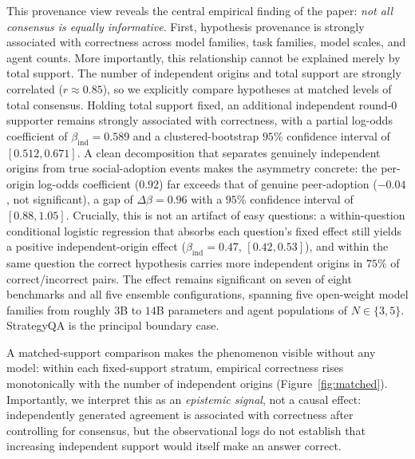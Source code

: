This provenance view reveals the central empirical finding of the paper: \emph{not all consensus is equally informative}. First, hypothesis provenance is strongly associated with correctness across model families, task families, model scales, and agent counts. More importantly, this relationship cannot be explained merely by total support. The number of independent origins and total support are strongly correlated ($r\approx0.85$), so we explicitly compare hypotheses at matched levels of total consensus. Holding total support fixed, an additional independent round-$0$ supporter remains strongly associated with correctness, with a partial log-odds coefficient of $\beta_{\mathrm{ind}}=0.589$ and a clustered-bootstrap $95\%$ confidence interval of $[0.512,0.671]$. A clean decomposition that separates genuinely independent origins from true social-adoption events makes the asymmetry concrete: the per-origin log-odds coefficient ($0.92$) far exceeds that of genuine peer-adoption ($-0.04$, not significant), a gap of $\Delta\beta=0.96$ with a $95\%$ confidence interval of $[0.88,1.05]$. Crucially, this is not an artifact of easy questions: a within-question conditional logistic regression that absorbs each question's fixed effect still yields a positive independent-origin effect ($\beta_{\mathrm{ind}}=0.47$, $[0.42,0.53]$), and within the same question the correct hypothesis carries more independent origins in $75\%$ of correct/incorrect pairs. The effect remains significant on seven of eight benchmarks and all five ensemble configurations, spanning five open-weight model families from roughly $3$B to $14$B parameters and agent populations of $N\in\{3,5\}$. StrategyQA is the principal boundary case.

A matched-support comparison makes the phenomenon visible without any model: within each fixed-support stratum, empirical correctness rises monotonically with the number of independent origins (Figure~\ref{fig:matched}). Importantly, we interpret this as an \emph{epistemic signal}, not a causal effect: independently generated agreement is associated with correctness after controlling for consensus, but the observational logs do not establish that increasing independent support would itself make an answer correct.

